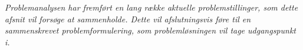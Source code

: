\textit{Problemanalysen har fremført en lang række aktuelle problemstillinger, som dette afsnit vil forsøge at sammenholde. Dette vil afslutningsvis føre til en sammenskrevet problemformulering, som problemløsningen vil tage udgangspunkt i.}